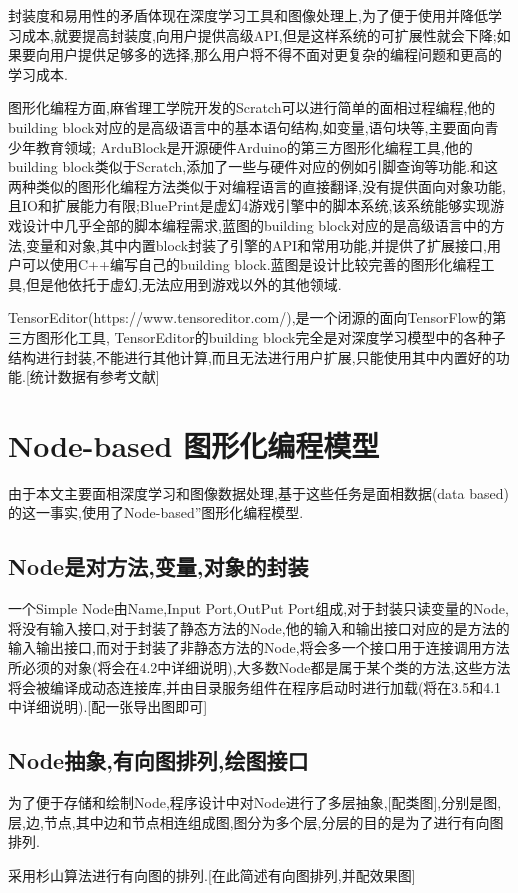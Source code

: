 \documentclass[10pt,journal,compsoc,UTF8]{IEEEtran}
\begin{document}
封装度和易用性的矛盾体现在深度学习工具和图像处理上,为了便于使用并降低学习成本,就要提高封装度,向用户提供高级API,但是这样系统的可扩展性就会下降;如果要向用户提供足够多的选择,那么用户将不得不面对更复杂的编程问题和更高的学习成本.

图形化编程方面,麻省理工学院开发的Scratch可以进行简单的面相过程编程,他的building block对应的是高级语言中的基本语句结构,如变量,语句块等,主要面向青少年教育领域; ArduBlock是开源硬件Arduino的第三方图形化编程工具,他的building block类似于Scratch,添加了一些与硬件对应的例如引脚查询等功能.和这两种类似的图形化编程方法类似于对编程语言的直接翻译,没有提供面向对象功能,且IO和扩展能力有限;BluePrint是虚幻4游戏引擎中的脚本系统,该系统能够实现游戏设计中几乎全部的脚本编程需求,蓝图的building block对应的是高级语言中的方法,变量和对象,其中内置block封装了引擎的API和常用功能,并提供了扩展接口,用户可以使用C++编写自己的building block.蓝图是设计比较完善的图形化编程工具,但是他依托于虚幻,无法应用到游戏以外的其他领域.

TensorEditor(https://www.tensoreditor.com/),是一个闭源的面向TensorFlow的第三方图形化工具, TensorEditor的building block完全是对深度学习模型中的各种子结构进行封装,不能进行其他计算,而且无法进行用户扩展,只能使用其中内置好的功能.[统计数据有参考文献]

\section{Node-based 图形化编程模型}
由于本文主要面相深度学习和图像数据处理,基于这些任务是面相数据(data based)的这一事实,使用了Node-based”图形化编程模型.
  \subsection{Node是对方法,变量,对象的封装}
  一个Simple Node由Name,Input Port,OutPut Port组成,对于封装只读变量的Node,将没有输入接口,对于封装了静态方法的Node,他的输入和输出接口对应的是方法的输入输出接口,而对于封装了非静态方法的Node,将会多一个接口用于连接调用方法所必须的对象(将会在4.2中详细说明),大多数Node都是属于某个类的方法,这些方法将会被编译成动态连接库,并由目录服务组件在程序启动时进行加载(将在3.5和4.1中详细说明).[配一张导出图即可]
  \subsection{Node抽象,有向图排列,绘图接口}
  为了便于存储和绘制Node,程序设计中对Node进行了多层抽象,[配类图],分别是图,层,边,节点,其中边和节点相连组成图,图分为多个层,分层的目的是为了进行有向图排列.

  采用杉山算法进行有向图的排列.[在此简述有向图排列,并配效果图]
\end{document}

